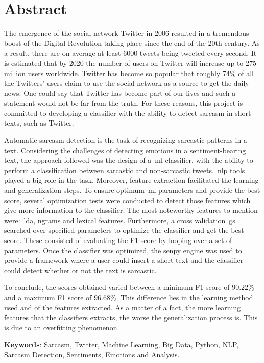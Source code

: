 \cleardoublepage
{}
\chapter*{Abstract}
The emergence of the social network Twitter in 2006 resulted in a tremendous boost of the Digital Revolution taking place since the end of the 20th century. As a result, there are on average at least 6000 tweets being tweeted every second. It is estimated that by 2020 the number of users on Twitter will increase up to 275 million users worldwide. Twitter has become so popular that roughly 74\% of all the Twitters' users claim to use the social network as a source to get the daily news. One could say that Twitter has become part of our lives and such a statement would not be far from the truth. For these reasons, this project is committed to developing a classifier with the ability to detect sarcasm in short texts, such as Twitter. \par
Automatic sarcasm detection is the task of recognizing sarcastic patterns in a text. Considering the challenges of detecting emotions in a sentiment-bearing text, the approach followed was the design of a~\acf{ml} classifier, with the ability to perform a classification between sarcastic and non-sarcastic tweets.~\acf{nlp} tools played a big role in the task. Moreover, feature extraction facilitated the learning and generalization steps. To ensure optimum~\ac{ml} parameters and provide the best score, several optimization tests were conducted to detect those features which give more information to the classifier. The most noteworthy features to mention were:~\acf{lda}, ngrams and lexical features. Furthermore, a cross validation~\acf{gs} searched over specified parameters to optimize the classifier and get the best score. These consisted of evaluating the F1 score by looping over a set of parameters.  Once the classifier was optimized, the senpy engine was used to provide a framework where a user could insert a short text and the classifier could detect whether or not the text is sarcastic.\par
To conclude, the scores obtained varied between a minimum F1 score of $90.22$\% and a maximum F1 score of $96.68$\%. This difference lies in the learning method used and of the features extracted. As a matter of a fact, the more learning features that the classifiers extracts, the worse the generalization process is. This is due to an overfitting phenomenon.



\vfill
\textbf{Keywords}: Sarcasm, Twitter, Machine Learning, Big Data, Python, NLP, Sarcasm Detection, Sentiments, Emotions and Analysis.